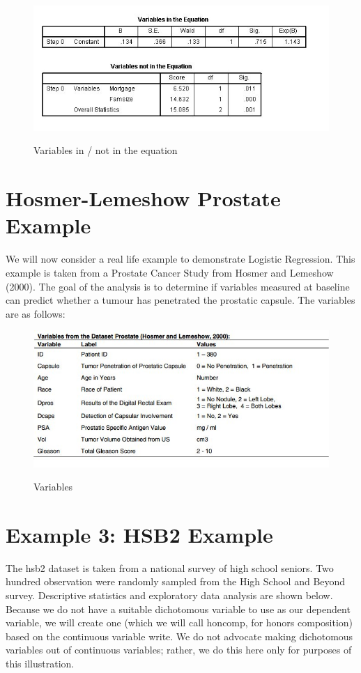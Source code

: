 \documentclass[a4paper,12pt]{article}
\begin{document}
\begin{figure}
\begin{center}
  \includegraphics[scale=0.6]{images/Logistic4}\\
  \caption{Variables in / not in the equation}
\end{center}
\end{figure}

\newpage
\section*{Hosmer-Lemeshow Prostate Example}
We will now consider a real life example to demonstrate Logistic Regression. This example is taken from a Prostate Cancer Study from Hosmer and Lemeshow (2000). The goal of the analysis is to determine if variables
measured at baseline can predict whether a tumour has penetrated the prostatic capsule. The variables are as follows:
\begin{center}
\begin{figure}[h!]
  \includegraphics[scale=0.6]{images/LogWeek10C.jpg}\\
  \caption{Variables}
\end{figure}
\end{center}


\newpage
\section{Example 3: HSB2 Example}
The hsb2 dataset is taken from a national survey of high school seniors. Two hundred observation were randomly sampled from the High School and Beyond survey. Descriptive statistics and exploratory data analysis are shown below.
Because we do not have a suitable dichotomous variable to use as our dependent variable, we will create one (which we will call honcomp, for honors composition) based on the continuous variable write.  We do not advocate making dichotomous variables out of continuous variables; rather, we do this here only for purposes of this illustration.
\end{document}

